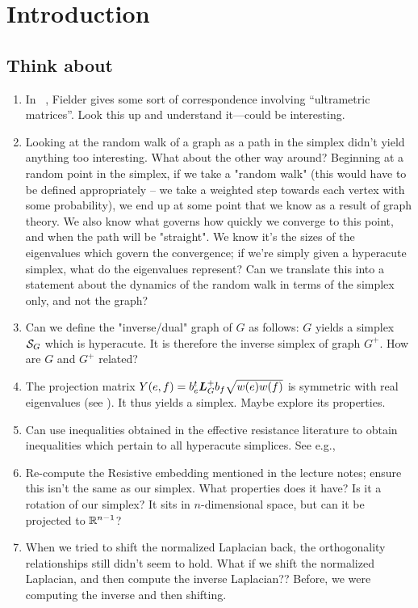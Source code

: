 \chapter{Introduction}


\section{Think about}
\begin{enumerate}	
	\item In ~\cite{fiedler1998some}, Fielder gives some sort of correspondence involving ``ultrametric matrices''. Look this up and understand it---could be interesting. 
	\item Looking at the random walk of a graph as a path in the simplex didn't yield anything too interesting. What about the other way around? Beginning at a random point in the simplex, if we take a "random walk" (this would have to be defined appropriately -- we take a weighted step towards each vertex with some probability), we end up at some point that we know as a result of graph theory. We also know what governs how quickly we converge to this point, and when the path will be "straight". We know it's the sizes of the eigenvalues which govern the convergence; if we're simply given a hyperacute simplex, what do the eigenvalues represent? Can we translate this into a statement about the dynamics of the random walk in terms of the simplex only, and not the graph?
	\item Can we define the "inverse/dual" graph of $G$ as follows: $G$ yields a simplex $\mathcal{S}_G$ which is hyperacute. It is therefore the inverse simplex of  graph $G^+$. How are $G$ and $G^+$ related?
	\item The projection matrix $Y(e,f)=b_e^t \vb*{L}_G^+b_f\sqrt{w(e)w(f)}$ is symmetric with real eigenvalues (see \cite{vishnoi2013lx}). It thus yields a simplex. Maybe explore its properties. 
	\item Can use inequalities obtained in the effective resistance literature to obtain inequalities which pertain to all hyperacute simplices. See e.g.,\cite{alev2017graph} 
\item Re-compute the Resistive embedding mentioned in the lecture notes; ensure this isn't the same as our simplex. What properties does it have? Is it a rotation of our simplex? It sits in $n$-dimensional space, but can it be projected to $\mathbb{R}^{n-1}$? 
\item When we tried to shift the normalized Laplacian back, the orthogonality relationships still didn't seem to hold. What if we shift the normalized Laplacian, and then compute the inverse Laplacian?? Before, we were computing the inverse and then shifting.  

\end{enumerate}
